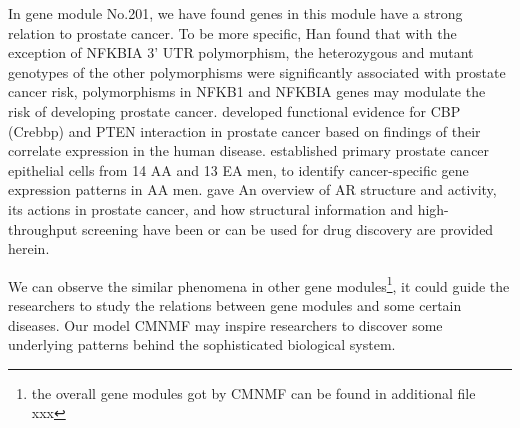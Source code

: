 \documentclass{bmcart}
\begin{document}
In gene module No.201, we have found genes in this module have a strong relation to prostate cancer. To be more specific, Han \cite{Han2015} found that with the exception of NFKBIA 3' UTR polymorphism, the heterozygous and mutant genotypes of the other polymorphisms were significantly associated with prostate cancer risk, polymorphisms in NFKB1 and NFKBIA genes may modulate the risk of developing prostate cancer. \cite{Ding2014} developed functional evidence for CBP (Crebbp) and PTEN interaction in prostate cancer based on findings of their correlate expression in the human disease.  \cite{Timofeeva2009} established primary prostate cancer epithelial cells from 14 AA and 13 EA men, to identify cancer-specific gene expression patterns in AA men.
\cite{Tan2015} gave An overview of AR structure and activity, its actions in prostate cancer, and how structural information and high-throughput screening have been or can be used for drug discovery are provided herein.


 We can observe the similar phenomena in other gene modules\footnote{the overall gene modules got by CMNMF can be found in additional file xxx}, it could guide the researchers to study the relations between gene modules and some certain diseases. Our model CMNMF may inspire researchers to discover some underlying patterns behind the sophisticated biological system.
\end{document}
